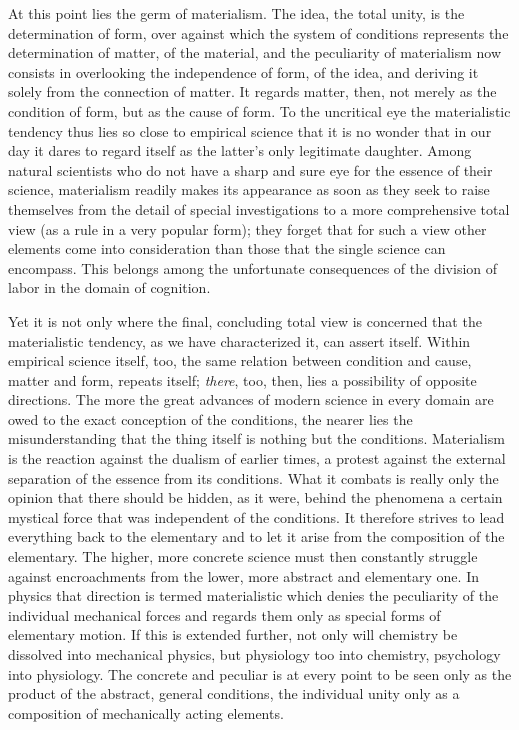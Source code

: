 \documentclass[12pt,a4paper,openany]{book}
\newcommand{\opage}[1]{\marginnote{\footnotesize\textit{[#1]}}}
\begin{document}
At this point lies the germ of materialism.
The idea, the total unity, is the determination of form, over against
which the system of conditions represents the determination of matter, of the
material, and the peculiarity of materialism
now consists in overlooking the independence of form, of the idea, and
deriving it solely from the connection of matter. It regards
matter, then, not merely as the condition of form, but
as the cause of form. To the uncritical eye the materialistic tendency
thus lies so close to empirical science
that it is no wonder that in our day it dares to regard itself
as the latter's only legitimate daughter. Among natural scientists who
do not have a sharp and sure eye for the essence
of their science, materialism readily makes its appearance as soon as they
seek to raise themselves from the detail of special investigations to a more
comprehensive total view (as a rule in a very popular form);
they forget that for such a view other elements come
into consideration than those that the single science can encompass.
\opage{196}This belongs among the unfortunate consequences of the division of labor in
the domain of cognition.

Yet it is not only where the final,
concluding total view is concerned that the materialistic tendency,
as we have characterized it, can assert itself.
Within empirical science itself, too, the same relation
between condition and cause, matter
and form, repeats itself; \emph{there}, too, then, lies a possibility of opposite
directions. The more the great advances of modern science
in every domain are owed to the exact conception of the conditions,
the nearer lies the misunderstanding that the thing
itself is nothing but the conditions. Materialism is
the reaction against the dualism of earlier times, a protest against
the external separation of the essence from its conditions.
What it combats is really only the opinion that there
should be hidden, as it were, behind the phenomena a certain
mystical force that was independent of the conditions. It
therefore strives to lead everything back to the elementary and to let
it arise from the composition of the elementary. The higher, more
concrete science must then constantly struggle against encroachments
from the lower, more abstract and elementary one. In physics
that direction is termed materialistic which denies the peculiarity of the individual
mechanical forces and regards them only
as special forms of elementary motion. If
this is extended further, not only will chemistry be dissolved into mechanical physics,
but physiology too into chemistry, psychology into physiology.
The concrete and peculiar is at every point to be
seen only as the product of the abstract, general conditions, the
individual unity only as a composition of mechanically
acting elements.
\end{document}
